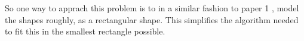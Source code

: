 \documentclass[a4paper]{article}
\begin{document}
    
    So one way to apprach this problem is to in a similar fashion to paper 1 \cite{mongolia}, model the shapes roughly, as a rectangular shape. This simplifies the algorithm needed to fit this in the smallest rectangle possible.\\ 







    

 

\end{document}
